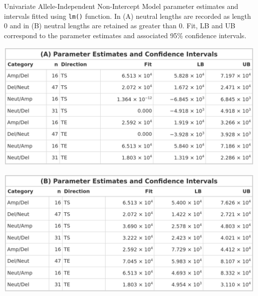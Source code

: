 \begin{table}[H]
\vspace{0.5cm}
    \caption[Univariate Allele-Independent Non-Intercept Model parameter estimates and intervals fitted using \texttt{lm()} function.]{Univariate Allele-Independent Non-Intercept Model parameter estimates and intervals fitted using \texttt{lm()} function. In (A) neutral lengths are recorded as length 0 and in (B) neutral lengths are retained as greater than 0. Fit, LB and UB correspond to the parameter estimates and associated 95\% confidence intervals. }
    \label{tbl:lm_uni_2_pred}
     \begin{subtable}[t]{.49\textwidth}
      \centering
      \includegraphics[width = 1\textwidth]{../tables/Chapter_5/Univariate_lm_6_AI_Pred.png}
    \end{subtable}%
    \hspace{0.5cm}
     \begin{subtable}[t]{.49\textwidth}
      \centering
         \includegraphics[width = 1\textwidth]{../tables/Chapter_5/Univariate_lm_6_Neut_AI_Pred.png}
    \end{subtable} 
\end{table}

